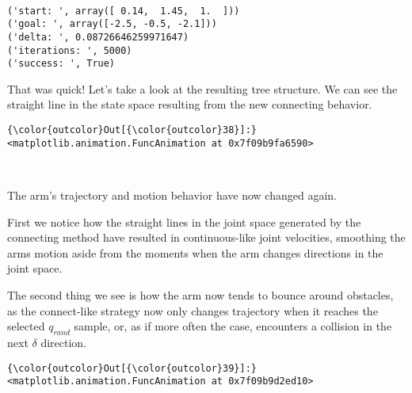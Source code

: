 \documentclass{article}
\begin{document}
    \begin{center}
    \end{center}
    { \hspace*{\fill} \\}
    

    \begin{Verbatim}[commandchars=\\\{\}]
('start: ', array([ 0.14,  1.45,  1.  ]))
('goal: ', array([-2.5, -0.5, -2.1]))
('delta: ', 0.08726646259971647)
('iterations: ', 5000)
('success: ', True)
    \end{Verbatim}

    That was quick! Let's take a look at the resulting tree structure. We
can see the straight line in the state space resulting from the new
connecting behavior.



            \begin{Verbatim}[commandchars=\\\{\}]
{\color{outcolor}Out[{\color{outcolor}38}]:} <matplotlib.animation.FuncAnimation at 0x7f09b9fa6590>
\end{Verbatim}
        
    \begin{center}
    \end{center}
    { \hspace*{\fill} \\}
    
    The arm's trajectory and motion behavior have now changed again.

First we notice how the straight lines in the joint space generated by
the connecting method have resulted in continuous-like joint velocities,
smoothing the arms motion aside from the moments when the arm changes
directions in the joint space.

The second thing we see is how the arm now tends to bounce around
obstacles, as the connect-like strategy now only changes trajectory when
it reaches the selected $q_{rand}$ sample, or, as if more often the
case, encounters a collision in the next $\delta$ direction.


            \begin{Verbatim}[commandchars=\\\{\}]
{\color{outcolor}Out[{\color{outcolor}39}]:} <matplotlib.animation.FuncAnimation at 0x7f09b9d2ed10>
\end{Verbatim}
        
\end{document}
